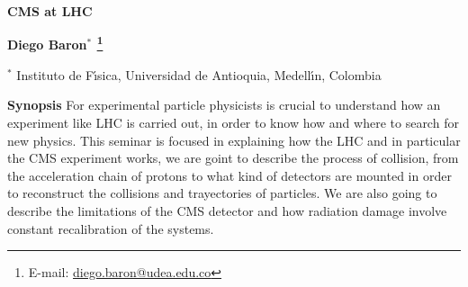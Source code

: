 \documentclass[a4paper,11pt]{article}
\newcommand{\abstracttitle}[1]{
 \begin{center}{\Large {\bf #1}}\end{center}
}
\newcommand{\authors}[1]{
 \vspace*{-0.3cm}
 \begin{center} {\bf #1} \end{center}
 \vspace*{-0.3cm}
}
\newcommand{\addresses}[1]{
 \begin{center} {\small #1} \end{center}
}
\newcommand{\synopsis}[1]{
 \begin{center}
 \setstretch{0.75}
 \begin{minipage}[t]{16cm}
   {\footnotesize {\bf Synopsis} #1 }
 \end{minipage}
 \setstretch{1.0}
 \end{center}
}
\newcommand{\writeto}[1]{
 \hspace*{-2.5mm} \footnote{E-mail: \href{mailto:#1}{#1}}\hspace*{-1.5mm}
}
\begin{document}
\abstracttitle{
CMS at LHC
}

\authors{
Diego Baron$^{\ast}$\writeto{diego.baron@udea.edu.co}


}

\addresses{
$^\ast$ Instituto de F\'{\i}sica, Universidad de Antioquia, Medell\'{\i}n, Colombia \\
}

\synopsis{
For experimental particle physicists is crucial to understand how an experiment like LHC is carried out, in order to know how and where to search for new physics. This seminar is focused in explaining how the LHC and in particular the CMS experiment works, we are goint to describe the process of collision, from the acceleration chain of protons to what kind of detectors are mounted in order to reconstruct the collisions and trayectories of particles. We are also going to describe the limitations of the CMS detector and how radiation damage involve constant recalibration of the systems.
}
\end{document}
